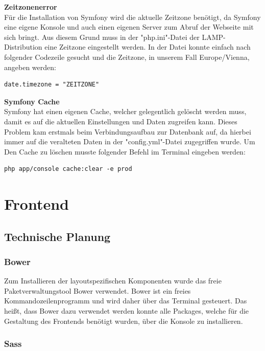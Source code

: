 \textbf{Zeitzonenerror}\\
Für die Installation von Symfony wird die aktuelle Zeitzone benötigt, da Symfony eine eigene Konsole und auch einen eigenen Server zum Abruf der Webseite mit sich bringt.
Aus diesem Grund muss in der "php.ini"-Datei der LAMP-Distribution eine Zeitzone eingestellt werden. In der Datei konnte einfach nach folgender Codezeile gesucht und die Zeitzone, in unserem Fall Europe/Vienna, angeben werden:
	\lstset{language=java}
  	\begin{lstlisting}
date.timezone = "ZEITZONE"
  	\end{lstlisting}
\pagebreak
\textbf{Symfony Cache}\\
Symfony hat einen eigenen Cache, welcher gelegentlich gelöscht werden muss, damit es auf die aktuellen Einstellungen und Daten zugreifen kann.
Dieses Problem kam erstmals beim Verbindungsaufbau zur Datenbank auf, da hierbei immer auf die veralteten Daten in der "config.yml"-Datei zugegriffen wurde.
Um Den Cache zu löschen musste folgender Befehl im Terminal eingeben werden:
	\lstset{language=bash}
  	\begin{lstlisting}
php app/console cache:clear -e prod
  	\end{lstlisting}

\section{Frontend}

  \subsection{Technische Planung}

    \subsubsection{Bower}

Zum Installieren der layoutspezifischen Komponenten wurde das freie Paketverwaltungstool {Bower\cite{bower}} verwendet. Bower ist ein freies Kommandozeilenprogramm und wird daher über das Terminal gesteuert. Das heißt, dass Bower dazu verwendet werden konnte alle Packages, welche für die Gestaltung des Frontends benötigt wurden, über die Konsole zu installieren.

    \subsubsection{Sass}

